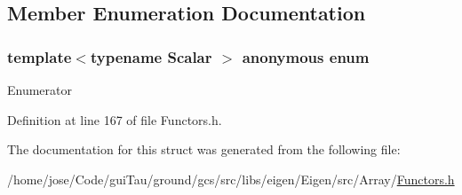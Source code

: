 \subsection{Member Enumeration Documentation}
\hypertarget{structei__functor__traits_3_01ei__scalar__inverse__op_3_01_scalar_01_4_01_4_a4df02a5e952e281d65999a3da1520cec}{\subsubsection[{anonymous enum}]{\setlength{\rightskip}{0pt plus 5cm}template$<$typename Scalar $>$ anonymous enum}}\label{structei__functor__traits_3_01ei__scalar__inverse__op_3_01_scalar_01_4_01_4_a4df02a5e952e281d65999a3da1520cec}
\begin{Desc}
\item[Enumerator]\par
\begin{description}
\item[{\em 
\hypertarget{structei__functor__traits_3_01ei__scalar__inverse__op_3_01_scalar_01_4_01_4_a4df02a5e952e281d65999a3da1520ceca8841268f6306fb77aef38cf9049911ed}{Cost}\label{structei__functor__traits_3_01ei__scalar__inverse__op_3_01_scalar_01_4_01_4_a4df02a5e952e281d65999a3da1520ceca8841268f6306fb77aef38cf9049911ed}
}]\end{description}
\end{Desc}


Definition at line 167 of file Functors.\-h.



The documentation for this struct was generated from the following file\-:\begin{DoxyCompactItemize}
\item 
/home/jose/\-Code/gui\-Tau/ground/gcs/src/libs/eigen/\-Eigen/src/\-Array/\hyperlink{_array_2_functors_8h}{Functors.\-h}\end{DoxyCompactItemize}
